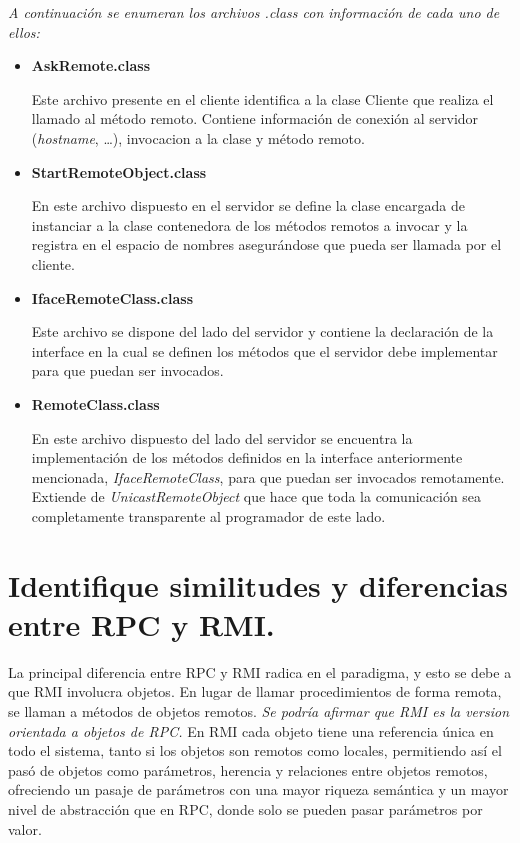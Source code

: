 \documentclass[osajnl,twocolumn,showpacs,superscriptaddress,10pt]{revtex4-1} %
\begin{document}
\textit{A continuación se enumeran los archivos .class con información de cada uno de ellos:}

\begin{itemize}
    \item \textbf{AskRemote.class}
    
    Este archivo presente en el cliente identifica a la clase Cliente 
    que realiza el llamado al método remoto. Contiene información de conexión al servidor (\textit{hostname}, \ldots),
    invocacion a la clase y método remoto.

    \item \textbf{StartRemoteObject.class}
    
    En este archivo dispuesto en el servidor se define la clase encargada de instanciar a la clase contenedora de los métodos remotos a invocar y la registra
    en el espacio de nombres asegurándose que pueda ser llamada por el cliente.

    \item \textbf{IfaceRemoteClass.class}
    
    Este archivo se dispone del lado del servidor y contiene la declaración de la interface en la cual
    se definen los métodos que el servidor debe implementar para que puedan ser invocados.

    \item \textbf{RemoteClass.class}
    
    En este archivo dispuesto del lado del servidor se encuentra la implementación de los métodos definidos en la
    interface anteriormente mencionada, \textit{IfaceRemoteClass}, para que puedan
    ser invocados remotamente. Extiende de \textit{UnicastRemoteObject} que hace que toda la comunicación
    sea completamente transparente al programador de este lado.
\end{itemize}

\section{Identifique similitudes y diferencias entre RPC y RMI.}

La principal diferencia entre RPC y RMI radica en el paradigma, y esto
se debe a que RMI involucra objetos.
En lugar de llamar procedimientos de forma remota, se llaman a métodos de
objetos remotos. \textit{Se podría afirmar que RMI es la version orientada a objetos
de RPC.} En RMI cada objeto tiene una referencia única en todo el sistema,
tanto si los objetos son remotos como locales, permitiendo así el pasó de
objetos como parámetros, herencia y relaciones entre objetos remotos,
ofreciendo un pasaje de parámetros con una mayor riqueza semántica y un
mayor nivel de abstracción que en RPC, donde solo se pueden pasar
parámetros por valor.
\end{document}
